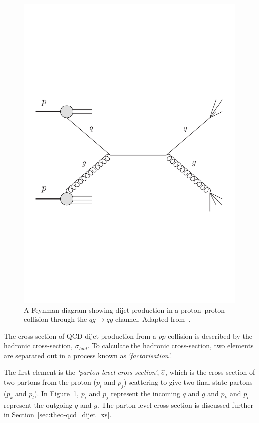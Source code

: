 \begin{figure}[!hbt]
\vspace{-1em}
  \begin{center}
    \includegraphics[width=0.65\linewidth, angle=0]{figs/Theory/qcd_dijet_feynman.pdf}
  \end{center}
  \vspace{-1em}
  \caption[A Feynman diagram showing dijet production in a proton--proton collision through the $qg \to qg$ channel.]
          {A Feynman diagram showing dijet production in a proton--proton collision through the $qg \to qg$ channel. Adapted from~\cite{theo-qcd_dijet_feynman}.}
          \label{fig:theo-qcd_dijet_feynman}
\vspace{-1em}
\end{figure}

The cross-section of QCD dijet production from a $pp$ collision is described by the hadronic cross-section, $\sigma_{had}$.
To calculate the hadronic cross-section, two elements are separated out in a process known as \textit{`factorisation'}.

The first element is the \textit{`parton-level cross-section'}, $\hat{\sigma}$, which is the cross-section of
two partons from the proton ($p_i$ and $p_j$) scattering to give two final state partons ($p_k$ and $p_l$).
In Figure~\ref{fig:theo-qcd_dijet_feynman}, $p_i$ and $p_j$ represent the incoming $q$ and $g$ and $p_k$ and $p_l$ represent the outgoing $q$ and $g$.
The parton-level cross section is discussed further in Section~\ref{sec:theo-qcd_dijet_xs}.

